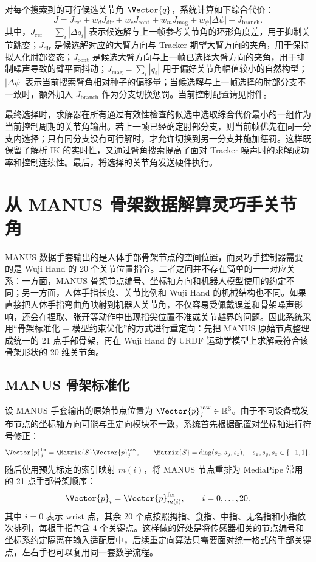 对每个搜索到的可行候选关节角 $\Vector{q}$，系统计算如下综合代价：
\begin{equation}
    J =
    J_{\mathrm{ref}}
    + w_d J_{\mathrm{dir}}
    + w_c J_{\mathrm{cont}}
    + w_m J_{\mathrm{mag}}
    + w_\psi |\Delta \psi|
    + J_{\mathrm{branch}} .
\end{equation}
其中，$J_{\mathrm{ref}}=\sum_i |\Delta q_i|$ 表示候选解与上一帧参考关节角的环形角度差，用于抑制关节跳变；$J_{\mathrm{dir}}$ 是候选解对应的大臂方向与 Tracker 期望大臂方向的夹角，用于保持拟人化肘部姿态；$J_{\mathrm{cont}}$ 是候选大臂方向与上一帧已选择大臂方向的夹角，用于抑制噪声导致的臂平面抖动；$J_{\mathrm{mag}}=\sum_i |q_i|$ 用于偏好关节角幅值较小的自然构型；$|\Delta\psi|$ 表示当前搜索臂角相对种子的偏移量；当候选解与上一帧选择的肘部分支不一致时，额外加入 $J_{\mathrm{branch}}$ 作为分支切换惩罚。当前控制配置请见附件。

最终选择时，求解器在所有通过有效性检查的候选中选取综合代价最小的一组作为当前控制周期的关节角输出。若上一帧已经确定肘部分支，则当前帧优先在同一分支内选择；只有同分支没有可行解时，才允许切换到另一分支并施加惩罚。这样既保留了解析 IK 的实时性，又通过臂角搜索提高了面对 Tracker 噪声时的求解成功率和控制连续性。最后，将选择的关节角发送硬件执行。

\section{从 MANUS 骨架数据解算灵巧手关节角}
MANUS 数据手套输出的是人体手部骨架节点的空间位置，而灵巧手控制器需要的是 Wuji Hand 的 20 个关节位置指令。二者之间并不存在简单的一一对应关系：一方面，MANUS 骨架节点编号、坐标轴方向和机器人模型使用的约定不同；另一方面，人体手指长度、关节比例和 Wuji Hand 的机械结构也不同。如果直接把人体手指弯曲角映射到机器人关节角，不仅容易受佩戴误差和骨架噪声影响，还会在捏取、张开等动作中出现指尖位置不准或关节越界的问题。因此系统采用“骨架标准化 + 模型约束优化”的方式进行重定向：先把 MANUS 原始节点整理成统一的 21 点手部骨架，再在 Wuji Hand 的 URDF 运动学模型上求解最符合该骨架形状的 20 维关节角。

\subsection{MANUS 骨架标准化}
设 MANUS 手套输出的原始节点位置为 $\Vector{p}^{\mathrm{raw}}_j \in \mathbb{R}^3$。由于不同设备或发布节点的坐标轴方向可能与重定向模块不一致，系统首先根据配置对坐标轴进行符号修正：
\begin{equation}
    \Vector{p}^{\mathrm{fix}}_j =
    \Matrix{S}\Vector{p}^{\mathrm{raw}}_j,\qquad
    \Matrix{S}=\operatorname{diag}(s_x,s_y,s_z),\quad
    s_x,s_y,s_z\in\{-1,1\}.
\end{equation}
随后使用预先标定的索引映射 $m(i)$，将 MANUS 节点重排为 MediaPipe 常用的 21 点手部骨架顺序：
\begin{equation}
    \Vector{p}_i = \Vector{p}^{\mathrm{fix}}_{m(i)},\qquad i=0,\ldots,20 .
\end{equation}
其中 $i=0$ 表示 wrist 点，其余 20 个点按照拇指、食指、中指、无名指和小指依次排列，每根手指包含 4 个关键点。这样做的好处是将传感器相关的节点编号和坐标系约定隔离在输入适配层中，后续重定向算法只需要面对统一格式的手部关键点，左右手也可以复用同一套数学流程。

